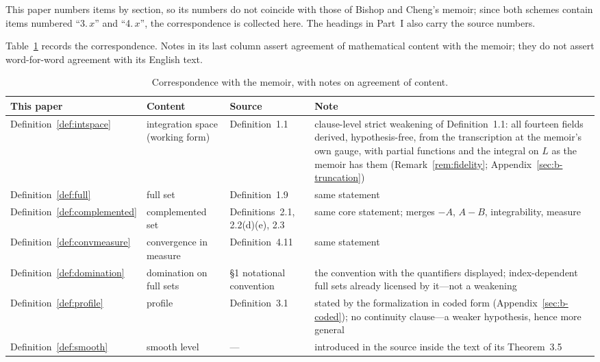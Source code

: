\documentclass[11pt]{article}
\theoremstyle{definition}
\theoremstyle{remark}
\begin{document}
This paper numbers items by section, so its numbers do not coincide with those of Bishop and Cheng's memoir; since both schemes contain items numbered ``3.$\,x$'' and ``4.$\,x$'', the correspondence is collected here.  The headings in Part~I also carry the source numbers.

Table~\ref{tab:memoir} records the correspondence.  Notes in its last column assert agreement of mathematical content with the memoir; they do not assert word-for-word agreement with its English text.

\begin{table}[htbp]
\centering\small
\setlength{\abovecaptionskip}{0pt}\setlength{\belowcaptionskip}{2pt}
\caption{Correspondence with the memoir, with notes on agreement of content.}
\label{tab:memoir}
\setlength{\tabcolsep}{3pt}
\begin{tabular}{p{}p{}p{}p{}}
\hline
This paper & Content & Source & Note \\
\hline
Definition~\ref{def:intspace} & integration space (working form) & Definition~1.1 & clause-level strict weakening of Definition~1.1: all fourteen fields derived, hypothesis-free, from the transcription at the memoir's own gauge, with partial functions and the integral on $L$ as the memoir has them (Remark~\ref{rem:fidelity}; Appendix~\ref{sec:b-truncation}) \\
Definition~\ref{def:full} & full set & Definition~1.9 & same statement \\
Definition~\ref{def:complemented} & complemented set & Definitions~2.1, 2.2(d)(e), 2.3 & same core statement; merges $-A$, $A-B$, integrability, measure \\
Definition~\ref{def:convmeasure} & convergence in measure & Definition~4.11 & same statement \\
Definition~\ref{def:domination} & domination on full sets & \S1 notational convention & the convention with the quantifiers displayed; index-dependent full sets already licensed by it---not a weakening \\
Definition~\ref{def:profile} & profile & Definition~3.1 & stated by the formalization in coded form (Appendix~\ref{sec:b-coded}); no continuity clause---a weaker hypothesis, hence more general \\
Definition~\ref{def:smooth} & smooth level & --- & introduced in the source inside the text of its Theorem~3.5 \\

\end{tabular}
\end{table}
\end{document}
